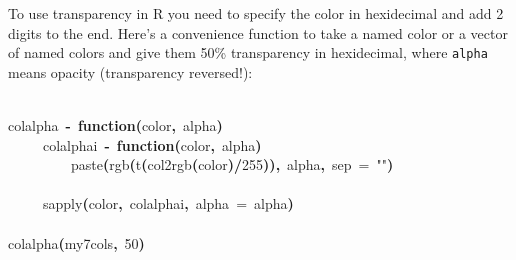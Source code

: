 \documentclass[a4paper]{article}
\newcommand{\hlnumber}[1]{\textcolor[rgb]{0.0823529411764706,0.0784313725490196,0.709803921568627}{#1}}%
\newcommand{\hlfunctioncall}[1]{\textcolor[rgb]{1,0,0}{#1}}%
\newcommand{\hlstring}[1]{\textcolor[rgb]{0.6,0.6,1}{#1}}%
\newcommand{\hlkeyword}[1]{\textcolor[rgb]{0,0,0}{\textbf{#1}}}%
\newcommand{\hlargument}[1]{\textcolor[rgb]{0.694117647058824,0.247058823529412,0.0196078431372549}{#1}}%
\newcommand{\hlformalargs}[1]{\textcolor[rgb]{0.0705882352941176,0.713725490196078,0.0705882352941176}{#1}}%
\newcommand{\hlassignement}[1]{\textcolor[rgb]{0.215686274509804,0.215686274509804,0.384313725490196}{\textbf{#1}}}%
\newcommand{\hlsymbol}[1]{\textcolor[rgb]{0,0,0}{#1}}%
\newcommand{\hlprompt}[1]{\textcolor[rgb]{0,0,0}{#1}}%
\newcommand{\hlstd}[1]{\textcolor[rgb]{0,0,0}{#1}}%
\newenvironment{Houtput}{\raggedright}{%
%
}
\renewenvironment{Schunk}{\vspace{\topsep}}{\vspace{\topsep}}
\begin{document}
To use transparency in R you need to specify the color in hexidecimal and add 2 digits to the end. Here's a convenience function to take a named color or a vector of named colors and give them 50\% transparency in hexidecimal, where \texttt{alpha} means opacity (transparency reversed!):

\begin{Houtput}
\hspace*{\fill}\\
\hlstd{}\ttfamily\noindent
\hlprompt{\usebox{\hlnormalsizeboxgreaterthan}{\ }}\hlsymbol{colalpha}{\ }\hlassignement{\usebox{\hlnormalsizeboxlessthan}-}{\ }\hlkeyword{function}\hlkeyword{(}\hlformalargs{color}\hlkeyword{,}{\ }\hlformalargs{alpha}\hlkeyword{)}{\ }\hlkeyword{\usebox{\hlnormalsizeboxopenbrace}}\hspace*{\fill}\\
\hlstd{}\hlprompt{{\ }}{\ }{\ }{\ }{\ }\hlsymbol{colalphai}{\ }\hlassignement{\usebox{\hlnormalsizeboxlessthan}-}{\ }\hlkeyword{function}\hlkeyword{(}\hlformalargs{color}\hlkeyword{,}{\ }\hlformalargs{alpha}\hlkeyword{)}{\ }\hlkeyword{\usebox{\hlnormalsizeboxopenbrace}}\hspace*{\fill}\\
\hlstd{}\hlprompt{{\ }}{\ }{\ }{\ }{\ }{\ }{\ }{\ }{\ }\hlfunctioncall{paste}\hlkeyword{(}\hlfunctioncall{rgb}\hlkeyword{(}\hlfunctioncall{t}\hlkeyword{(}\hlfunctioncall{col2rgb}\hlkeyword{(}\hlsymbol{color}\hlkeyword{)}\hlkeyword{/}\hlnumber{255}\hlkeyword{)}\hlkeyword{)}\hlkeyword{,}{\ }\hlsymbol{alpha}\hlkeyword{,}{\ }\hlargument{sep}{\ }\hlargument{=}{\ }\hlstring{""}\hlkeyword{)}\hspace*{\fill}\\
\hlstd{}\hlprompt{{\ }}{\ }{\ }{\ }{\ }\hlkeyword{\usebox{\hlnormalsizeboxclosebrace}}\hspace*{\fill}\\
\hlstd{}\hlprompt{{\ }}{\ }{\ }{\ }{\ }\hlfunctioncall{sapply}\hlkeyword{(}\hlsymbol{color}\hlkeyword{,}{\ }\hlsymbol{colalphai}\hlkeyword{,}{\ }\hlargument{alpha}{\ }\hlargument{=}{\ }\hlsymbol{alpha}\hlkeyword{)}\hspace*{\fill}\\
\hlstd{}\hlprompt{{\ }}\hlkeyword{\usebox{\hlnormalsizeboxclosebrace}}\mbox{}
\normalfont
\hspace*{\fill}\\
\hlstd{}\ttfamily\noindent
\hlprompt{\usebox{\hlnormalsizeboxgreaterthan}{\ }}\hlfunctioncall{colalpha}\hlkeyword{(}\hlsymbol{my7cols}\hlkeyword{,}{\ }\hlnumber{50}\hlkeyword{)}\mbox{}
\normalfont
\hspace*{\fill}\\
\hlstd{}\begin{Schunk}

\end{Schunk}
\end{Houtput}
\end{document}
